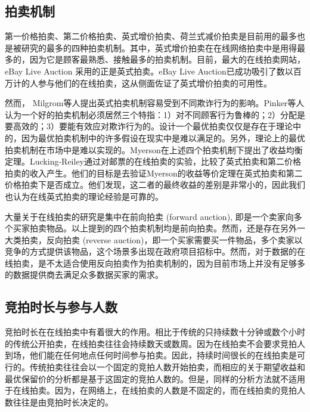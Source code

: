 \subsection{拍卖机制}

第一价格拍卖、第二价格拍卖、英式增价拍卖、荷兰式减价拍卖是目前用的最多也是被研究的最多的四种拍卖机制。其中，英式增价拍卖在在线网络拍卖中是用得最多的，因为它是顾客最熟悉、接触最多的拍卖机制。目前，最大的在线拍卖网站，eBay Live Auction 采用的正是英式拍卖。eBay Live Auction已成功吸引了数以百万计的人参与他们的在线拍卖，这从侧面佐证了英式增价拍卖的可用性。

然而， Milgrom等人\cite{Milgrom1989Auctions}提出英式拍卖机制容易受到不同欺诈行为的影响。Pinker等人\cite{Pinker2001Using,Pinker2003Managing}认为一个好的拍卖机制必须居然三个特指：1）对不同顾客行为鲁棒的；2）分配是要高效的；3）要能有效应对欺诈行为的。设计一个最优拍卖仅仅是存在于理论中的，因为最优拍卖机制中的许多假设在现实中是难以满足的。另外，理论上的最优拍卖机制在市场中是难以实现的。Myerson\cite{Myerson1981Optimal}在上述四个拍卖机制下提出了收益均衡定理。Lucking-Reiley\cite{Lucking1999Using}通过对邮票的在线拍卖的实验，比较了英式拍卖和第二价格拍卖的收入产生。他们的目标是去验证Myerson的收益等价定理在英式拍卖和第二价格拍卖下是否成立。他们发现，这二者的最终收益的差别是非常小的，因此我们也认为在线英式拍卖的理论经验是可靠的。

大量关于在线拍卖的研究是集中在前向拍卖 (forward auction), 即是一个卖家向多个买家拍卖物品。以上提到的四个拍卖机制均是前向拍卖。然而，还是存在另外一大类拍卖，反向拍卖 (reverse auction)，即一个买家需要买一件物品，多个卖家以竞争的方式提供该物品，这个场景多出现在政府项目招标中。然而，对于数据的在线拍卖，是不太适合使用反向拍卖作为拍卖机制的，因为目前市场上并没有足够多的数据提供商去满足众多数据买家的需求。

\subsection{竞拍时长与参与人数}
\label{subsec:auction duration and bidder number}
竞拍时长在在线拍卖中有着很大的作用。相比于传统的只持续数十分钟或数个小时的传统公开拍卖，在线拍卖往往会持续数天或数周。因为在线拍卖不会要求竞拍人到场，他们能在任何地点任何时间参与拍卖\cite{Pinker2003Managing}。因此，持续时间很长的在线拍卖是可行的。传统拍卖往往会以一个固定的竞拍人数开始拍卖，而相应的关于期望收益和最优保留价的分析都是基于这固定的竞拍人数的。但是，同样的分析方法就不适用于在线拍卖。因为，在网络上，在线拍卖的人数是不固定的，而在线拍卖的竞拍人数往往是由竞拍时长决定的。

